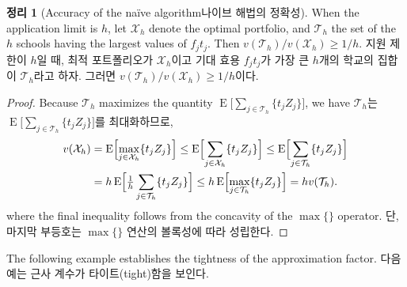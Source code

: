 \documentclass[11pt]{article} %
\newtheorem{theorem}{Theorem}
\theoremstyle{definition}
\newtheorem{theorem}{정리}
\theoremstyle{definition}
\begin{document}
\begin{theorem}[\ifen Accuracy of the na\"ive algorithm\else 나이브 해법의 정확성\fi] \label{oneoverhopt}
\ifen 
When the application limit is $h$, let $\mathcal{X}_h$ denote the optimal portfolio, and $\mathcal{T}_h$ the set of the $h$ schools having the largest values of $f_j t_j$. Then $v(\mathcal{T}_h) / v(\mathcal{X}_h) \geq 1/h$. 
\else
지원 제한이 $h$일 때, 최적 포트폴리오가 $\mathcal{X}_h$이고 기대 효용 $f_j t_j$가 가장 큰 $h$개의 학교의 집합이 $\mathcal{T}_h$라고 하자. 그러면 $v(\mathcal{T}_h) / v(\mathcal{X}_h) \geq 1/h$이다.
\fi
\end{theorem}
\begin{proof}
\ifen
Because $\mathcal{T}_h$ maximizes the quantity $\operatorname{E}\bigl[ \sum_{j \in \mathcal{T}_h}\{ t_j Z_j \}\bigr]$, we have
\else
$\mathcal{T}_h$는 $\operatorname{E}\bigl[ \sum_{j \in \mathcal{T}_h}\{ t_j Z_j \}\bigr]$를 최대화하므로,
\fi
\begin{align} \label{oneoverhopt}
\begin{split}
v(\mathcal{X}_h) &= \operatorname{E}\Bigl[ \max_{j \in \mathcal{X}_h}\{ t_j Z_j \}\Bigr] \leq \operatorname{E}\Bigl[ \sum_{j \in \mathcal{X}_h}\{ t_j Z_j \}\Bigr] \leq \operatorname{E}\Bigl[ \sum_{j \in \mathcal{T}_h}\{ t_j Z_j \}\Bigr] \\
&= h  \operatorname{E}\Bigl[ \tfrac{1}{h} \sum_{j \in \mathcal{T}_h}\{ t_j Z_j \}\Bigr]
\leq h  \operatorname{E}\Bigl[ \max_{j \in \mathcal{T}_h}\{ t_j Z_j \}\Bigr]
= h v(\mathcal{T}_h).
\end{split}
\end{align}
\ifen 
where the final inequality follows from the concavity of the $\max\{\}$ operator.
\else
단, 마지막 부등호는 $\max\{\}$ 연산의 볼록성에 따라 성립한다.
\fi
\end{proof}
\ifen
\noindent The following example establishes the tightness of the approximation factor. 
\else
\noindent 다음 예는 근사 계수가 타이트(tight)함을 보인다.
\fi
\end{document}
